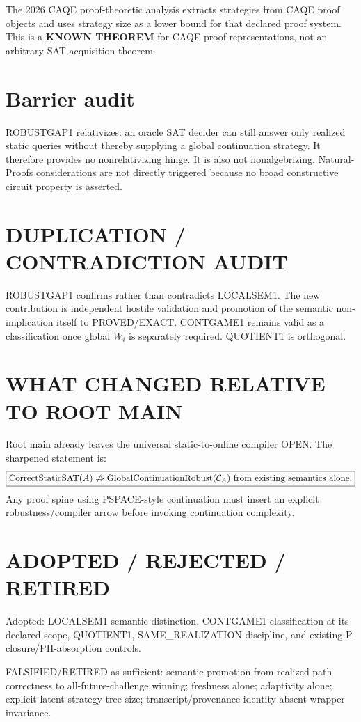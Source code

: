 \documentclass[11pt]{article}
\begin{document}
The 2026 CAQE proof-theoretic analysis extracts strategies from CAQE proof objects and uses strategy size as a lower bound for that declared proof system. This is a \textbf{KNOWN THEOREM} for CAQE proof representations, not an arbitrary-SAT acquisition theorem.

\section*{Barrier audit}
ROBUSTGAP1 relativizes: an oracle SAT decider can still answer only realized static queries without thereby supplying a global continuation strategy. It therefore provides no nonrelativizing hinge. It is also not nonalgebrizing. Natural-Proofs considerations are not directly triggered because no broad constructive circuit property is asserted.

\section*{DUPLICATION / CONTRADICTION AUDIT}
ROBUSTGAP1 confirms rather than contradicts LOCALSEM1. The new contribution is independent hostile validation and promotion of the semantic non-implication itself to PROVED/EXACT. CONTGAME1 remains valid as a classification once global \(W_i\) is separately required. QUOTIENT1 is orthogonal.

\section*{WHAT CHANGED RELATIVE TO ROOT MAIN}
Root main already leaves the universal static-to-online compiler OPEN. The sharpened statement is:
\[
\boxed{\operatorname{CorrectStaticSAT}(A)\not\Rightarrow
\operatorname{GlobalContinuationRobust}({\cal C}_A)
\text{ from existing semantics alone}.}
\]
Any proof spine using PSPACE-style continuation must insert an explicit robustness/compiler arrow before invoking continuation complexity.

\section*{ADOPTED / REJECTED / RETIRED}
Adopted: LOCALSEM1 semantic distinction, CONTGAME1 classification at its declared scope, QUOTIENT1, SAME\_REALIZATION discipline, and existing P-closure/PH-absorption controls.

FALSIFIED/RETIRED as sufficient: semantic promotion from realized-path correctness to all-future-challenge winning; freshness alone; adaptivity alone; explicit latent strategy-tree size; transcript/provenance identity absent wrapper invariance.
\end{document}
